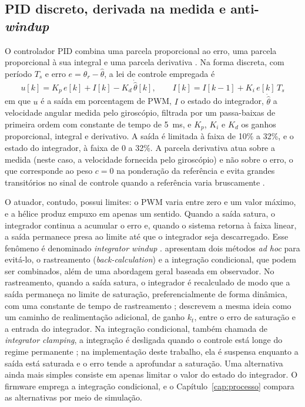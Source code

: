 \subsection{PID discreto, derivada na medida e anti-\textit{windup}}

O controlador PID combina uma parcela proporcional ao erro, uma parcela proporcional à sua integral e uma parcela derivativa \cite[p.~64]{astrom1995}. Na forma discreta, com período $T_s$ e erro $e=\theta_r-\hat\theta$, a lei de controle empregada é
\begin{equation}
 u[k]=K_p\,e[k]+I[k]-K_d\,\dot{\hat\theta}[k],\qquad I[k]=I[k-1]+K_i\,e[k]\,T_s
 \label{eq:pid}
\end{equation}
em que $u$ é a saída em porcentagem de PWM, $I$ o estado do integrador, $\dot{\hat\theta}$ a velocidade angular medida pelo giroscópio, filtrada por um passa-baixas de primeira ordem com constante de tempo de 5~ms, e $K_p$, $K_i$ e $K_d$ os ganhos proporcional, integral e derivativo. A saída é limitada à faixa de 10\% a 32\%, e o estado do integrador, à faixa de 0 a 32\%. A parcela derivativa atua sobre a medida (neste caso, a velocidade fornecida pelo giroscópio) e não sobre o erro, o que corresponde ao peso $c=0$ na ponderação da referência e evita grandes transitórios no sinal de controle quando a referência varia bruscamente \cite[p.~73--74]{astrom1995}.

O atuador, contudo, possui limites: o PWM varia entre zero e um valor máximo, e a hélice produz empuxo em apenas um sentido. Quando a saída satura, o integrador continua a acumular o erro e, quando o sistema retorna à faixa linear, a saída permanece presa ao limite até que o integrador seja descarregado. Esse fenômeno é denominado \textit{integrator windup} \cite[p.~1693]{astrom1989}.  apresentam dois métodos \textit{ad hoc} para evitá-lo, o rastreamento (\textit{back-calculation}) e a integração condicional, que podem ser combinados, além de uma abordagem geral baseada em observador. No rastreamento, quando a saída satura, o integrador é recalculado de modo que a saída permaneça no limite de saturação, preferencialmente de forma dinâmica, com uma constante de tempo de rastreamento \cite[p.~83--84]{astrom1995};  descrevem a mesma ideia como um caminho de realimentação adicional, de ganho $k_t$, entre o erro de saturação e a entrada do integrador. Na integração condicional, também chamada de \textit{integrator clamping}, a integração é desligada quando o controle está longe do regime permanente \cite[p.~88--89]{astrom1995}; na implementação deste trabalho, ela é suspensa enquanto a saída está saturada e o erro tende a aprofundar a saturação. Uma alternativa ainda mais simples consiste em apenas limitar o valor do estado do integrador. O firmware emprega a integração condicional, e o Capítulo~\ref{cap:processo} compara as alternativas por meio de simulação.
